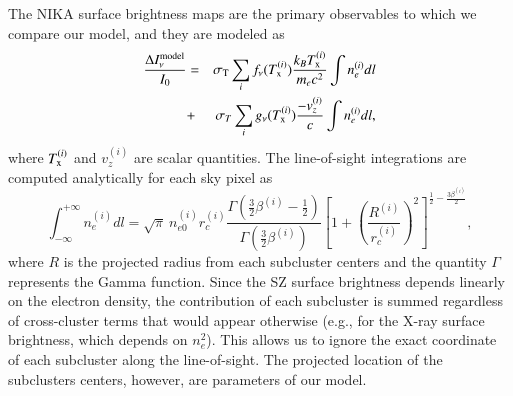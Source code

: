 \documentclass[twocolumn,traditabstract]{aa}
\begin{document}
The NIKA surface brightness maps are the primary observables to which we compare our model, and they are modeled as
\begin{eqnarray}
\frac{\Delta I_{\nu}^{\rm model}}{I_0} & = & \sigma_{\rm T} \sum\limits_{i} f_{\nu}(T_{\rm x}^{(i)}) \frac{k_B T_{\rm x}^{(i)}}{m_e c^2} \int n_e^{(i)} dl \nonumber \\
       & + & \sigma_T \sum\limits_{i} g_{\nu}(T_{\rm x}^{(i)}) \frac{-v_z^{(i)}}{c} \int n_e^{(i)} dl, \nonumber \\	        
\label{eq:Inu_model}
\end{eqnarray}
where $T_{\rm x}^{(i)}$ and $v_z^{(i)}$ are scalar quantities. The line-of-sight integrations are computed analytically for each sky pixel as
\begin{equation}
	\int^{+\infty}_{-\infty} n_e^{(i)} dl = \sqrt{\pi} \ n_{e0}^{(i)} r_c^{(i)}\frac{\Gamma\left(\frac{3}{2} \beta^{(i)} -\frac{1}{2}\right)}{\Gamma\left(\frac{3}{2} \beta^{(i)}\right)} \left[1+\left(\frac{R^{(i)}}{r_c^{(i)}}\right)^2 \right]^{\frac{1}{2}-\frac{3 \beta^{(i)}}{2}},
\label{eq:beta_model_integ}
\end{equation}
where $R$ is the projected radius from each subcluster centers and the quantity $\Gamma$ represents the Gamma function. Since the SZ surface brightness depends linearly on the electron density, the contribution of each subcluster is summed regardless of cross-cluster terms that would appear otherwise (e.g., for the X-ray surface brightness, which depends on $n_e^2$). This allows us to ignore the exact coordinate of each subcluster along the line-of-sight. The projected location of the subclusters centers, however, are parameters of our model.

\end{document}
